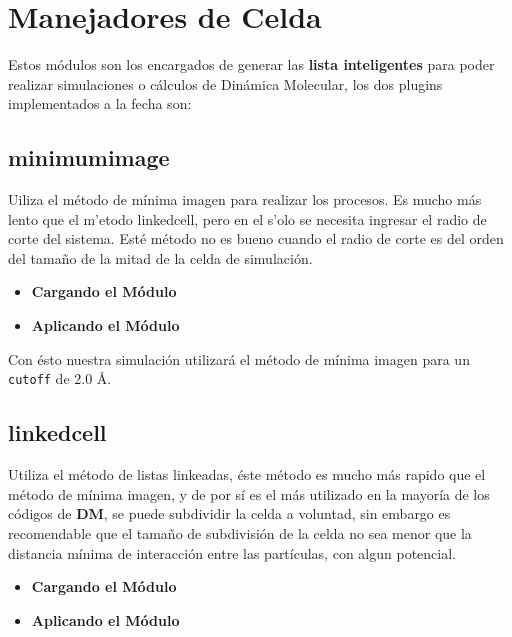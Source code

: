\section{Manejadores de Celda}
Estos m\'odulos son los encargados de generar las \textbf{lista inteligentes} para poder realizar simulaciones o c\'alculos de Din\'amica Molecular, los dos plugins implementados a la fecha son:

\subsection{minimumimage}
Uiliza el m\'etodo de m\'inima imagen para realizar los procesos. Es mucho m\'as lento que el m'etodo linkedcell, pero en el s'olo se necesita ingresar el radio de corte del sistema. Est\'e m\'etodo no es bueno cuando el radio de corte es del orden del tama\~no de la mitad de la celda de simulaci\'on.

\begin{itemize}
 \item \textbf{Cargando el M\'odulo}
 \item \textbf{Aplicando el M\'odulo}
\end{itemize}

Con \'esto nuestra simulaci\'on utilizar\'a el m\'etodo de m\'inima imagen para un \verb|cutoff| de 2.0 \AA.

\subsection{linkedcell}
Utiliza el m\'etodo de listas linkeadas, \'este m\'etodo es mucho m\'as rapido que el m\'etodo de m\'inima imagen, y de por s\'i es el m\'as utilizado en la mayor\'ia de los c\'odigos de \textbf{DM}, se puede subdividir la celda a voluntad, sin embargo es recomendable que el tama\~no de subdivisi\'on de la celda no sea menor que la distancia m\'inima de interacci\'on entre las part\'iculas, con algun potencial.

\begin{itemize}
 \item \textbf{Cargando el M\'odulo}
 \item \textbf{Aplicando el M\'odulo}
\end{itemize}

